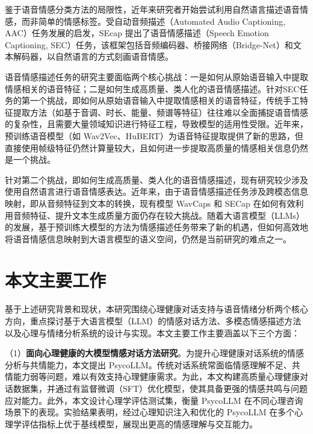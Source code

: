 鉴于语音情感分类方法的局限性，近年来研究者开始尝试利用自然语言描述语音情感，而非简单的情感标签。受自动音频描述（Automated Audio Captioning, AAC）\cite{Ye_Wang_Yang_Zou_2021}任务发展的启发，SEcap\cite{xu2024secap} 提出了语音情感描述（Speech Emotion Captioning, SEC）任务，该框架包括音频编码器、桥接网络（Bridge-Net）和文本解码器，以自然语言的方式刻画语音情感。

语音情感描述任务的研究主要面临两个核心挑战：一是如何从原始语音输入中提取情感相关的语音特征；二是如何生成高质量、类人化的语音情感描述。针对SEC任务的第一个挑战，即如何从原始语音输入中提取情感相关的语音特征，传统手工特征提取方法（如基于音调、时长、能量、频谱等特征）往往难以全面捕捉语音情感的复杂性，且需要大量领域知识进行特征工程，导致模型的适用性受限。近年来，预训练语音模型（如 Wav2Vec\cite{Schneider_Baevski_Collobert_Auli_2019}、HuBERT\cite{Hsu_Bolte_Tsai_Lakhotia_Salakhutdinov_Mohamed_2021}）为语音特征提取提供了新的思路，但直接使用帧级特征仍然计算量较大，且如何进一步提取高质量的情感相关信息仍然是一个挑战。

针对第二个挑战，即如何生成高质量、类人化的语音情感描述，现有研究较少涉及使用自然语言进行语音情感表达。近年来，由于语音情感描述任务涉及跨模态信息映射，即从音频特征到文本的转换，现有模型 WavCaps\cite{Mei_Meng_Liu_Kong_Ko_Zhao_Plumbley_Zou_Wang} 和 SECap\cite{xu2024secap} 在如何有效利用音频特征、提升文本生成质量方面仍存在较大挑战。随着大语言模型（LLMs）的发展，基于预训练大模型的方法为情感描述任务带来了新的机遇，但如何高效地将语音情感信息映射到大语言模型的语义空间，仍然是当前研究的难点之一。

\section{本文主要工作}

基于上述研究背景和现状，本研究围绕心理健康对话支持与语音情绪分析两个核心方向，重点探讨基于大语言模型（LLM）的情感对话方法、多模态情感描述方法以及心理与情绪分析系统的设计与实现。本文主要工作主要涵盖以下三个方面：

（1）\textbf{面向心理健康的大模型情感对话方法研究}。为提升心理健康对话系统的情感分析与共情能力，本文提出 PsycoLLM。传统对话系统常面临情感理解不足、共情能力弱等问题，难以有效支持心理健康需求。为此，本文构建高质量心理健康对话数据集，并通过有监督微调（SFT）优化模型，使其具备更强的情感共鸣与问题应对能力。此外，本文设计心理学评估测试集，衡量 PsycoLLM 在不同心理咨询场景下的表现。实验结果表明，经过心理知识注入和优化的 PsycoLLM 在多个心理学评估指标上优于基线模型，展现出更高的情感理解与交互能力。

